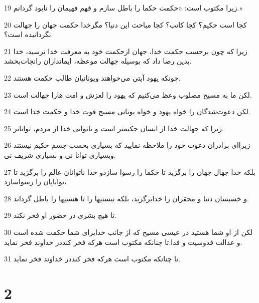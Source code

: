 \par 19 زیرا مکتوب است: «حکمت حکما را باطل سازم و فهم فهیمان را نابود گردانم.»
\par 20 کجا است حکیم؟ کجا کاتب؟ کجا مباحث این دنیا؟ مگرخدا حکمت جهان را جهالت نگردانیده است؟
\par 21 زیرا که چون برحسب حکمت خدا، جهان ازحکمت خود به معرفت خدا نرسید، خدا بدین رضا داد که بوسیله جهالت موعظه، ایمانداران رانجات‌بخشد.
\par 22 چونکه یهود آیتی می‌خواهند ویونانیان طالب حکمت هستند.
\par 23 لکن ما به مسیح مصلوب وعظ می‌کنیم که یهود را لغزش و امت هارا جهالت است.
\par 24 لکن دعوت‌شدگان را خواه یهود و خواه یونانی مسیح قوت خدا و حکمت خدا است.
\par 25 زیرا که جهالت خدا از انسان حکیمتر است و ناتوانی خدا از مردم، تواناتر.
\par 26 زیرا‌ای برادران دعوت خود را ملاحظه نمایید که بسیاری بحسب جسم حکیم نیستند وبسیاری توانا نی و بسیاری شریف نی.
\par 27 بلکه خدا جهال جهان را برگزید تا حکما را رسوا سازدو خدا ناتوانان عالم را برگزید تا توانایان را رسواسازد،
\par 28 و خسیسان دنیا و محقران را خدابرگزید، بلکه نیستیها را تا هستیها را باطل گرداند.
\par 29 تا هیچ بشری در حضور او فخر نکند.
\par 30 لکن از او شما هستید در عیسی مسیح که از جانب خدابرای شما حکمت شده است و عدالت قدوسیت و فدا.تا چنانکه مکتوب است هر‌که فخر کنددر خداوند فخر نماید.
\par 31 تا چنانکه مکتوب است هر‌که فخر کنددر خداوند فخر نماید.

\chapter{2}

